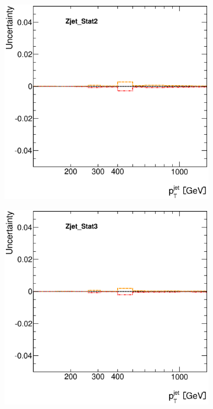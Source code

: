 \documentclass[12pt, twoside]{article}
\numberwithin{equation}{section}
\numberwithin{figure}{section}
\newenvironment{changemargin}[2]{%
\begin{list}{}{%
\setlength{\topsep}{0pt}%
\setlength{\leftmargin}{#1}%
\setlength{\rightmargin}{#2}%
\setlength{\listparindent}{\parindent}%
\setlength{\itemindent}{\parindent}%
\setlength{\parsep}{\parskip}%
}%
\item[]}{\end{list}}
\begin{document}
\begin{figure}[H]
\begin{changemargin}{-1.0cm}{-0.75cm}
\begin{changemargin}{-0.75cm}{-1.0cm}
        \begin{subfigure}[b]{0.25\textwidth}
            \includegraphics[width=\textwidth]{./images/JetSystematics/JetSystematic-49.eps}
        \end{subfigure}
        \begin{subfigure}[b]{0.25\textwidth}
            \includegraphics[width=\textwidth]{./images/JetSystematics/JetSystematic-50.eps}

\end{subfigure}
\end{changemargin}
\end{changemargin}
\end{figure}
\end{document}
